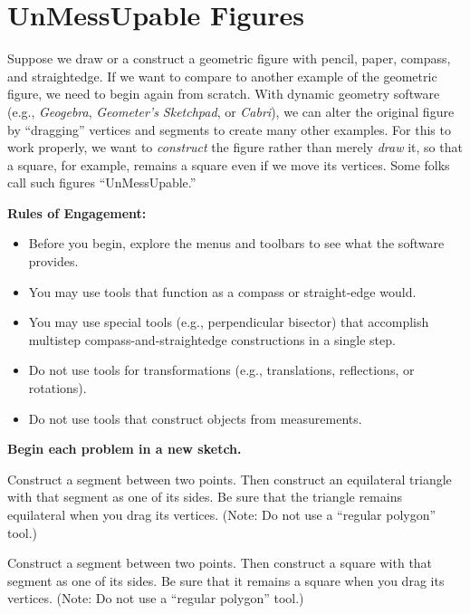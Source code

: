 \newpage

\section{UnMessUpable Figures}
Suppose we draw or a construct a geometric figure with pencil, paper, compass, and straightedge.  If we want to compare to another example of the geometric figure, we need to begin again from scratch.  With dynamic geometry software (e.g., \textsl{Geogebra}, \textsl{Geometer's Sketchpad}, or \textsl{Cabri}), we can alter the original figure by ``dragging'' vertices and segments to create many other examples.  For this to work properly, we want to \emph{construct} the figure rather than merely \emph{draw} it, so that a square, for example, remains a square even if we move its vertices.  Some folks call such figures ``UnMessUpable.'' 

\vspace{0.1in}
\begin{center}
\textbf{Rules of Engagement:}
\end{center}
\begin{itemize}
\itemsep0em
\item Before you begin, explore the menus and toolbars to see what the software provides.  
\item You may use tools that function as a compass or straight-edge would.  
\item You may use special tools (e.g., perpendicular bisector) that accomplish multistep     
compass-and-straightedge constructions in a single step.
\item Do not use tools for transformations (e.g., translations, reflections, or rotations).
\item Do not use tools that construct objects from measurements.  
\end{itemize}

\begin{center}
\textbf{Begin each problem in a new sketch.}
\end{center}

\begin{prob}
Construct a segment between two points.  Then construct an equilateral triangle with that segment as one of its sides.  Be sure that the triangle remains equilateral when you drag its vertices.   (Note:  Do not use a ``regular polygon'' tool.)
\end{prob}

\begin{prob}
Construct a segment between two points.  Then construct a square with that segment as one of its sides.  Be sure that it remains a square when you drag its vertices.  (Note:  Do not use a ``regular polygon'' tool.)
\end{prob}

